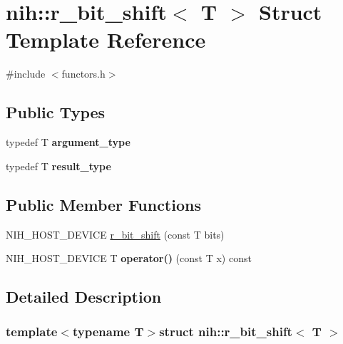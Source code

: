 \hypertarget{structnih_1_1r__bit__shift}{
\section{nih\-:\-:r\-\_\-bit\-\_\-shift$<$ \-T $>$ \-Struct \-Template \-Reference}
\label{structnih_1_1r__bit__shift}
}


{\ttfamily \#include $<$functors.\-h$>$}

\subsection*{\-Public \-Types}
\begin{DoxyCompactItemize}
\item 
\hypertarget{structnih_1_1r__bit__shift_aa36738e8d766f69b55180441f0f3e2ea}{
typedef \-T {\bfseries argument\-\_\-type}}
\label{structnih_1_1r__bit__shift_aa36738e8d766f69b55180441f0f3e2ea}

\item 
\hypertarget{structnih_1_1r__bit__shift_a165c5f97c78cd0c008670770390fb36a}{
typedef \-T {\bfseries result\-\_\-type}}
\label{structnih_1_1r__bit__shift_a165c5f97c78cd0c008670770390fb36a}

\end{DoxyCompactItemize}
\subsection*{\-Public \-Member \-Functions}
\begin{DoxyCompactItemize}
\item 
\-N\-I\-H\-\_\-\-H\-O\-S\-T\-\_\-\-D\-E\-V\-I\-C\-E \hyperlink{structnih_1_1r__bit__shift_af5a6f8aa38c808141246abdaceb924b9}{r\-\_\-bit\-\_\-shift} (const \-T bits)
\item 
\hypertarget{structnih_1_1r__bit__shift_a55dceea69030b0845b2ad5edfa959513}{
\-N\-I\-H\-\_\-\-H\-O\-S\-T\-\_\-\-D\-E\-V\-I\-C\-E \-T {\bfseries operator()} (const \-T x) const }
\label{structnih_1_1r__bit__shift_a55dceea69030b0845b2ad5edfa959513}

\end{DoxyCompactItemize}


\subsection{\-Detailed \-Description}
\subsubsection*{template$<$typename T$>$struct nih\-::r\-\_\-bit\-\_\-shift$<$ T $>$}


